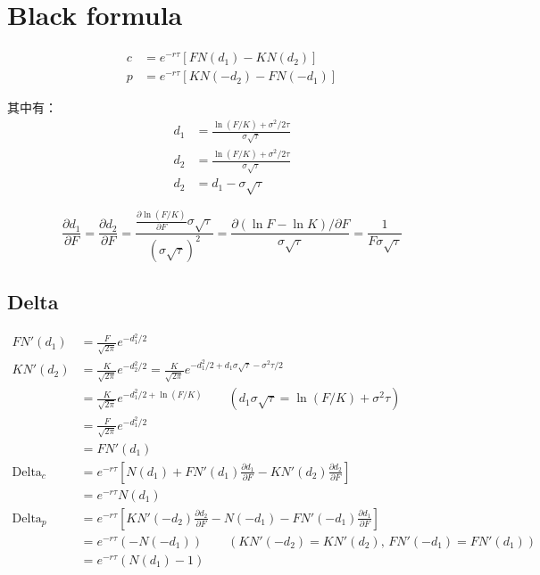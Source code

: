 \documentclass[11pt]{article}
\begin{document}
\section{Black formula}

\begin{align*}
    c &= e^{-r\tau}[FN(d_1) - KN(d_2)] \\
    p &= e^{-r\tau}[KN(-d_2) - FN(-d_1)]
\end{align*}

其中有：
\begin{align*}
    d_1 &= \frac{\ln(F/K) + \sigma^2/2\tau}{\sigma \sqrt{\tau}} \\
    d_2 &= \frac{\ln(F/K) + \sigma^2/2\tau}{\sigma \sqrt{\tau}} \\
    d_2 &= d_1 - \sigma \sqrt{\tau}
\end{align*}

\begin{equation*}
    \frac{\partial d_1}{\partial F} = \frac{\partial d_2}{\partial F} = \frac{\frac{\partial \ln(F/K)}{\partial F} \sigma \sqrt{\tau}}{(\sigma \sqrt{\tau})^2} = \frac{\partial (\ln F - \ln K)/\partial F}{\sigma\sqrt{\tau}} = \frac{1}{F\sigma\sqrt{\tau}}
\end{equation*}

\subsection{Delta}
\begin{align*}
    FN'(d_1) &= \frac{F}{\sqrt{2\pi}}e^{-d_1^2/2} \\
    KN'(d_2) &= \frac{K}{\sqrt{2\pi}}e^{-d_2^2/2} = \frac{K}{\sqrt{2\pi}}e^{-d_1^2/2+d_1\sigma\sqrt{\tau}-\sigma^2\tau/2} \\
    &= \frac{K}{\sqrt{2\pi}}e^{-d_1^2/2+\ln(F/K)} 
    \qquad \left(d_1\sigma\sqrt{\tau} = \ln(F/K)+\sigma^2\tau\right) \\
    &= \frac{F}{\sqrt{2\pi}}e^{-d_1^2/2} \\
    &= FN'(d_1) \\
    \text{Delta}_c &= e^{-r\tau}[N(d_1) + FN'(d_1)\frac{\partial d_1}{\partial F} - KN'(d_2)\frac{\partial d_2}{\partial F}] \\
    &= e^{-r\tau}N(d_1) \\
    \text{Delta}_p &= e^{-r\tau}[KN'(-d_2)\frac{\partial d_2}{\partial F} - N(-d_1) - FN'(-d_1)\frac{\partial d_1}{\partial F}] \\
    &= e^{-r\tau}(-N(-d_1)) \qquad \left(KN'(-d_2) = KN'(d_2),\, FN'(-d_1)= FN'(d_1)\right) \\
    &= e^{-r\tau}(N(d_1)-1)
\end{align*}
\end{document}
